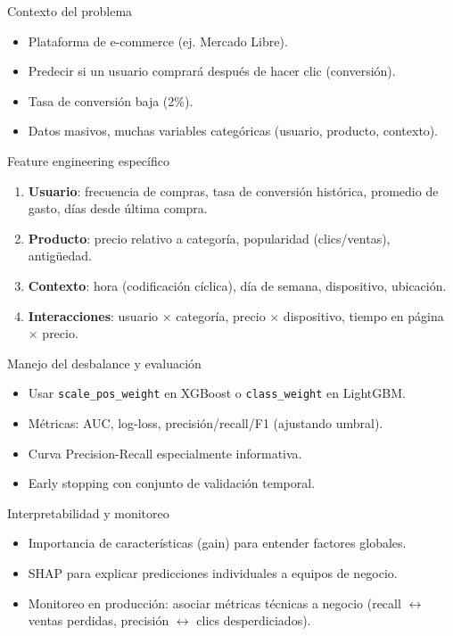 \documentclass[aspectratio=169, 10pt, xcolor=table]{beamer}
\begin{document}
\begin{frame}{Contexto del problema}
    \begin{itemize}
        \item Plataforma de e-commerce (ej. Mercado Libre).
        \item Predecir si un usuario comprará después de hacer clic (conversión).
        \item Tasa de conversión baja (2\%).
        \item Datos masivos, muchas variables categóricas (usuario, producto, contexto).
    \end{itemize}
\end{frame}

\begin{frame}{Feature engineering específico}
    \begin{enumerate}
        \item \textbf{Usuario}: frecuencia de compras, tasa de conversión histórica, promedio de gasto, días desde última compra.
        \item \textbf{Producto}: precio relativo a categoría, popularidad (clics/ventas), antigüedad.
        \item \textbf{Contexto}: hora (codificación cíclica), día de semana, dispositivo, ubicación.
        \item \textbf{Interacciones}: usuario × categoría, precio × dispositivo, tiempo en página × precio.
    \end{enumerate}
\end{frame}

\begin{frame}{Manejo del desbalance y evaluación}
    \begin{itemize}
        \item Usar \texttt{scale\_pos\_weight} en XGBoost o \texttt{class\_weight} en LightGBM.
        \item Métricas: AUC, log-loss, precisión/recall/F1 (ajustando umbral).
        \item Curva Precision-Recall especialmente informativa.
        \item Early stopping con conjunto de validación temporal.
    \end{itemize}
\end{frame}

\begin{frame}{Interpretabilidad y monitoreo}
    \begin{itemize}
        \item Importancia de características (gain) para entender factores globales.
        \item SHAP para explicar predicciones individuales a equipos de negocio.
        \item Monitoreo en producción: asociar métricas técnicas a negocio (recall $\leftrightarrow$ ventas perdidas, precisión $\leftrightarrow$ clics desperdiciados).
    \end{itemize}
\end{frame}
\end{document}
